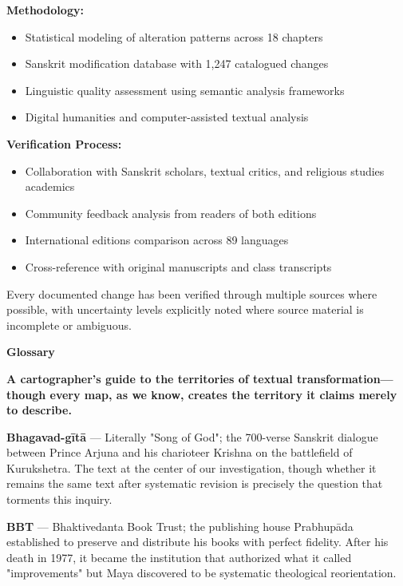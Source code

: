\documentclass[11pt,twoside]{book}
\makeatletter
\def\cleardoublepage{\clearpage\if@twoside \ifodd\c@page\else\hbox{}\thispagestyle{empty}\newpage\if@twocolumn\hbox{}\newpage\fi\fi\fi}
\makeatother
\begin{document}
\textbf{\textbf{Methodology:}}
\begin{itemize}
\item Statistical modeling of alteration patterns across 18 chapters
\item Sanskrit modification database with 1,247 catalogued changes
\item Linguistic quality assessment using semantic analysis frameworks
\item Digital humanities and computer-assisted textual analysis
\end{itemize}

\textbf{\textbf{Verification Process:}}
\begin{itemize}
\item Collaboration with Sanskrit scholars, textual critics, and religious studies academics
\item Community feedback analysis from readers of both editions
\item International editions comparison across 89 languages
\item Cross-reference with original manuscripts and class transcripts
\end{itemize}

Every documented change has been verified through multiple sources where possible, with uncertainty levels explicitly noted where source material is incomplete or ambiguous.

\clearpage
\pagestyle{sectionopening}
\cleardoublepage
\thispagestyle{empty}
\vspace*{0.25\textheight}
\begin{center}
{\Huge\bfseries Glossary}
\end{center}
\vspace*{\fill}
\cleardoublepage

\textbf{A cartographer's guide to the territories of textual transformation—though every map, as we know, creates the territory it claims merely to describe.}

\textbf{\textbf{Bhagavad-gītā}} — Literally "Song of God"; the 700-verse Sanskrit dialogue between Prince Arjuna and his charioteer Krishna on the battlefield of Kurukshetra. The text at the center of our investigation, though whether it remains the same text after systematic revision is precisely the question that torments this inquiry.

\textbf{\textbf{BBT}} — Bhaktivedanta Book Trust; the publishing house Prabhupāda established to preserve and distribute his books with perfect fidelity. After his death in 1977, it became the institution that authorized what it called "improvements" but Maya discovered to be systematic theological reorientation.
\end{document}
